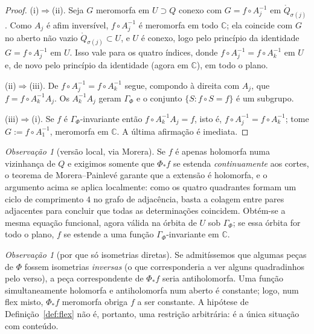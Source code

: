 \documentclass[11pt,a4paper]{article}
\theoremstyle{plain}
\theoremstyle{definition}
\theoremstyle{remark}
\newtheorem{observacao}[teorema]{Observação}
\newcommand{\C}{\mathbb{C}}
\begin{document}
\begin{proof}
(i)$\Rightarrow$(ii). Seja $G$ meromorfa em $U\supset Q$ conexo com
$G=f\circ A_j^{-1}$ em $\mathring Q_{\sigma(j)}$. Como $A_j$ é afim inversível,
$f\circ A_j^{-1}$ é meromorfa em todo $\C$; ela coincide com $G$ no aberto não
vazio $\mathring Q_{\sigma(j)}\subset U$, e $U$ é conexo, logo pelo princípio da
identidade $G=f\circ A_j^{-1}$ em $U$. Isso vale para os quatro índices, donde
$f\circ A_j^{-1}=f\circ A_k^{-1}$ em $U$ e, de novo pelo princípio da
identidade (agora em $\C$), em todo o plano.

(ii)$\Rightarrow$(iii). De $f\circ A_j^{-1}=f\circ A_k^{-1}$ segue, compondo à
direita com $A_j$, que $f=f\circ A_k^{-1}A_j$. Os $A_k^{-1}A_j$ geram
$\Gamma_\Phi$ e o conjunto $\{S: f\circ S=f\}$ é um subgrupo.

(iii)$\Rightarrow$(i). Se $f$ é $\Gamma_\Phi$-invariante então
$f\circ A_k^{-1}A_j=f$, isto é, $f\circ A_j^{-1}=f\circ A_k^{-1}$; tome
$G:=f\circ A_1^{-1}$, meromorfa em $\C$. A última afirmação é imediata.
\end{proof}

\begin{observacao}[versão local, via Morera]\label{obs:local}
Se $f$ é apenas holomorfa numa vizinhança de $Q$ e exigimos somente que
$\Phi_*f$ se estenda \emph{continuamente} aos cortes, o teorema de
Morera--Painlevé garante que a extensão é holomorfa, e o argumento acima se
aplica localmente: como os quatro quadrantes formam um ciclo de comprimento $4$
no grafo de adjacência, basta a colagem entre pares adjacentes para concluir que
todas as determinações coincidem. Obtém-se a mesma equação funcional, agora
válida na órbita de $U$ sob $\Gamma_\Phi$; se essa órbita for todo o plano, $f$
se estende a uma função $\Gamma_\Phi$-invariante em $\C$.
\end{observacao}

\begin{observacao}[por que só isometrias diretas]\label{obs:reflexao}
Se admitíssemos que algumas peças de $\Phi$ fossem isometrias \emph{inversas}
(o que corresponderia a ver alguns quadradinhos pelo verso), a peça
correspondente de $\Phi_*f$ seria antiholomorfa. Uma função simultaneamente
holomorfa e antiholomorfa num aberto é constante; logo, num flex misto,
$\Phi_*f$ meromorfa obriga $f$ a ser constante. A hipótese de
Definição~\ref{def:flex} não é, portanto, uma restrição arbitrária: é a única
situação com conteúdo.
\end{observacao}
\end{document}
